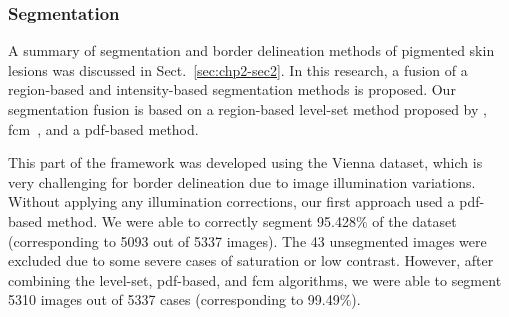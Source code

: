 \subsubsection{Segmentation}\label{chp3-subsubsecSeg}
A summary of segmentation and border delineation methods of pigmented skin lesions was discussed in Sect.~\ref{sec:chp2-sec2}.
In this research, a fusion of a region-based and intensity-based segmentation methods is proposed.
Our segmentation fusion is based on a region-based level-set method proposed by \cite{li2011level}, \acf{fcm}~\cite{bezdek1984fcm}, and a \acf{pdf}-based method.


This part of the framework was developed using the Vienna dataset, which is very challenging for border delineation due to image illumination variations. 
Without applying any illumination corrections, our first approach used a \ac{pdf}-based method.
We were able to correctly segment 95.428$\%$ of the dataset (corresponding to 5093 out of 5337 images).
The 43 unsegmented images were excluded due to some severe cases of saturation or low contrast.
However, after combining the level-set, \ac{pdf}-based, and \ac{fcm} algorithms, we were able to segment 5310 images out of 5337 cases (corresponding to 99.49$\%$).

